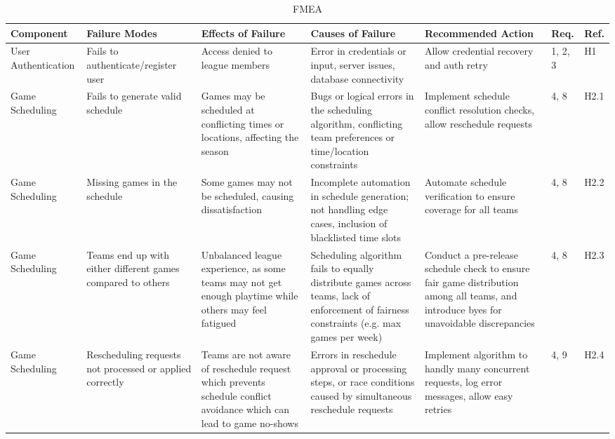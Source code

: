 \documentclass{article}
\begin{document}
\begin{landscape}
\begin{table}[hp]
    \caption{FMEA} \label{FMEA}
    \centering
    \begin{footnotesize}
    \begin{tabular}{|p{1in}|p{1in}|p{1in}|p{1.5in}|p{2.5in}|p{0.2in}|p{0.2in}|}
        \toprule
        \textbf{Component} & \textbf{Failure Modes} & \textbf{Effects of Failure} &\textbf{Causes of Failure}&\textbf{Recommended Action} &\textbf{Req.} &\textbf{Ref.} \\
        \bottomrule
        \hline
        
        User Authentication & 
        Fails to authenticate/register user
        & Access denied to league members & Error in credentials or input, server issues, database connectivity & Allow credential recovery and auth retry & 1, 2, 3 & H1 \\
        \hline
        Game Scheduling  & Fails to generate valid schedule & Games may be scheduled at conflicting times or locations, affecting the season & Bugs or logical errors in the scheduling algorithm, conflicting team preferences or time/location constraints & Implement schedule conflict resolution checks, allow reschedule requests & 4, 8 & H2.1 \\
        \hline
        Game Scheduling  & Missing games in the schedule & Some games may not be scheduled, causing dissatisfaction & Incomplete automation in schedule generation; not handling edge cases, inclusion of blacklisted time slots & Automate schedule verification to ensure coverage for all teams & 4, 8 & H2.2 \\
        \hline
        Game Scheduling  &  Teams end up with either different games compared to others & Unbalanced league experience, as some teams may not get enough playtime while others may feel fatigued & Scheduling algorithm fails to equally distribute games across teams, lack of enforcement of fairness constraints (e.g. max games per week) & Conduct a pre-release schedule check to ensure fair game distribution among all teams, and introduce byes for unavoidable discrepancies & 4, 8 & H2.3 \\
        \hline
        Game Scheduling  & Rescheduling requests not processed or applied correctly  & Teams are not aware of reschedule request which prevents schedule conflict avoidance which can lead to game no-shows & Errors in reschedule approval or processing steps,  or race conditions caused by simultaneous reschedule requests & Implement algorithm to handly many concurrent requests, log error messages, allow easy retries  & 4, 9 & H2.4 \\

\end{tabular}
\end{footnotesize}
\end{table}
\end{landscape}
\end{document}
